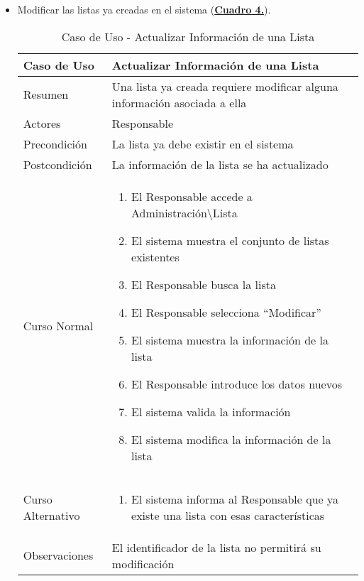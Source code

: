 \begin{itemize}
  \pagebreak
	\item \addtocounter{tabla}{1} Modificar las listas ya creadas en el sistema (\textbf{\hyperref[tab:curActualizarLista]{Cuadro 4.}}).
		\begin{table}[!htbp]
		  \centering \addtocounter{casouso}{1}
		  \begin{tabular}{|l | p{100mm}|}
		    \textbf{Caso de Uso}  & \textbf{Actualizar Información de una Lista} \\ \hline
		    Resumen 		 & Una lista ya creada requiere modificar alguna información asociada a ella \\ \hline
		    Actores  		 & Responsable \\ \hline
		    Precondición  	 & La lista ya debe existir en el sistema  \\ \hline
		    Postcondición  	 & La información de la lista se ha actualizado \\ \hline
		    Curso Normal   	 & \begin{enumerate}
			  \item El Responsable accede a Administración\textbackslash Lista
			  \item El sistema muestra el conjunto de listas existentes
			  \item El Responsable busca la lista
			  \item El Responsable selecciona ``Modificar''
			  \item El sistema muestra la información de la lista
			  \item El Responsable introduce los datos nuevos
			  \item El sistema valida la información
			  \item El sistema modifica la información de la lista
		    \end{enumerate}  \\ \hline
		    Curso Alternativo  & \begin{enumerate}
			  \item El sistema informa al Responsable que ya existe una lista con esas características
		    \end{enumerate}  \\ \hline
		    Observaciones 	 & El identificador de la lista no permitirá su modificación  \\ \hline
		  \end{tabular}
		  \caption{Caso de Uso  - Actualizar Información de una Lista}
		  \label{tab:curActualizarLista}
		\end{table}
		\FloatBarrier
		

\end{itemize}
